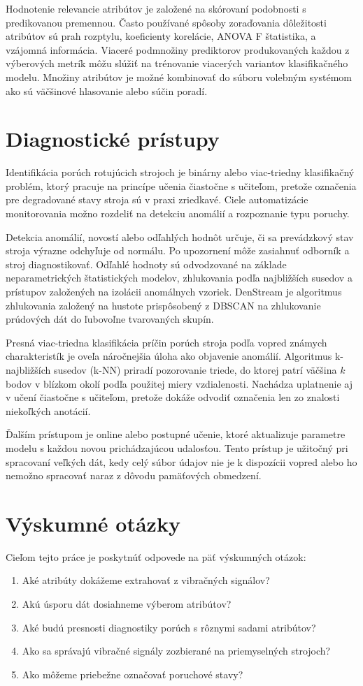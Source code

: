 Hodnotenie relevancie atribútov je založené na skórovaní podobnosti s predikovanou premennou. Často používané spôsoby zoraďovania dôležitosti atribútov sú prah rozptylu, koeficienty korelácie, ANOVA F štatistika, a vzájomná informácia. Viaceré podmnožiny prediktorov produkovaných každou z výberových metrík môžu slúžiť na trénovanie viacerých variantov klasifikačného modelu. Množiny atribútov je možné kombinovať do súboru volebným systémom ako sú väčšinové hlasovanie alebo súčin poradí.

\section{Diagnostické prístupy}
Identifikácia porúch rotujúcich strojoch je binárny alebo viac-triedny klasifikačný problém, ktorý pracuje na princípe učenia čiastočne s učiteľom, pretože označenia pre degradované stavy stroja sú v praxi zriedkavé. Ciele automatizácie monitorovania možno rozdeliť na detekciu anomálií a rozpoznanie typu poruchy.

Detekcia anomálií, novostí alebo odľahlých hodnôt určuje, či sa prevádzkový stav stroja výrazne odchyľuje od normálu. Po upozornení môže zasiahnuť odborník a stroj diagnostikovať. Odľahlé hodnoty sú odvodzované na základe neparametrických štatistických modelov, zhlukovania podľa najbližších susedov a prístupov založených na izolácii anomálnych vzoriek. DenStream je algoritmus zhlukovania založený na hustote prispôsobený z DBSCAN na zhlukovanie prúdových dát do ľubovoľne tvarovaných skupín.

Presná viac-triedna klasifikácia príčin porúch stroja podľa vopred známych charakteristík je oveľa náročnejšia úloha ako objavenie anomálií. Algoritmus k-najbližších susedov (k-NN) priradí pozorovanie triede, do ktorej patrí väčšina $k$ bodov v blízkom okolí podľa použitej miery vzdialenosti. Nachádza uplatnenie aj v učení čiastočne s učiteľom, pretože dokáže odvodiť označenia len zo znalosti niekoľkých anotácií.

Ďalším prístupom je online alebo postupné učenie, ktoré aktualizuje parametre modelu s každou novou prichádzajúcou udalosťou. Tento prístup je užitočný pri spracovaní veľkých dát, kedy celý súbor údajov nie je k dispozícii vopred alebo ho nemožno spracovať naraz z dôvodu pamäťových obmedzení.

\section{Výskumné otázky}
Cieľom tejto práce je poskytnúť odpovede na päť výskumných otázok:
\begin{enumerate}
\itemsep0pt
\item Aké atribúty dokážeme extrahovať z vibračných signálov?
\item Akú úsporu dát dosiahneme výberom atribútov?
\item Aké budú presnosti diagnostiky porúch s rôznymi sadami atribútov?
\item Ako sa správajú vibračné signály zozbierané na priemyselných strojoch?
\item Ako môžeme priebežne označovať poruchové stavy?
\end{enumerate}

